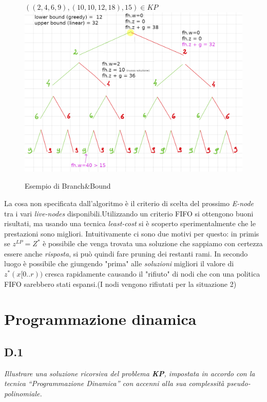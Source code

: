 \documentclass[a4paper]{article}
\begin{document}
\begin{adjustwidth}{.8cm}{0cm}
\begin{itemize}
	\end{itemize}
	\begin{figure}[!ht]
\centering
\textbf{$((2,4,6,9),(10,10,12,18),15) \in KP$}
\includegraphics[width=1\textwidth]{./img/C14_BB_manuale.png}
\caption{Esempio di Branch\&Bound} \label{FIG:C14_BB_manuale}
\end{figure}
	La cosa non specificata dall'algoritmo è il criterio di scelta del prossimo \textit{E-node} tra i vari \textit{live-nodes} disponibili.Utilizzando un criterio FIFO si ottengono buoni risultati, ma usando una tecnica \emph{least-cost} si è scoperto sperimentalmente che le prestazioni sono migliori.
	Intuitivamente ci sono due motivi per questo: in primis se $z^{LP} = Z^*$ è possibile che venga trovata una soluzione che sappiamo con certezza essere anche \textit{risposta}, si può quindi fare pruning dei restanti rami.
	In secondo luogo è possibile che giungendo "prima" alle \textit{soluzioni} migliori il valore di $z^*(x[0..r))$ cresca rapidamente causando il "rifiuto" di nodi che con una politica FIFO sarebbero stati espansi.(I nodi vengono rifiutati per la situazione 2)
\end{adjustwidth}
\section{Programmazione dinamica}
\subsection{D.1}
\emph{Illustrare una soluzione ricorsiva del problema \textbf{KP}, impostata in accordo con la tecnica “Programmazione Dinamica” con accenni alla sua complessità pseudo-polinomiale.}
\end{document}
